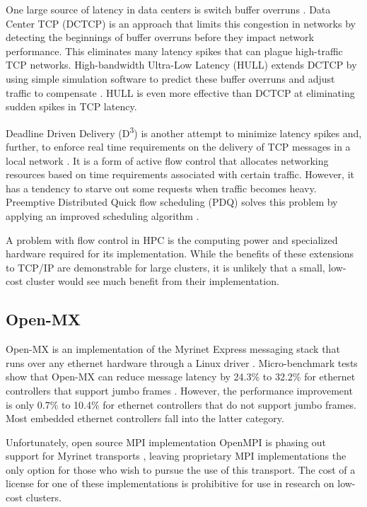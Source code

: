 \documentclass[11pt]{book}
\begin{document}
One large source of latency in data centers is switch buffer overruns
\cite{liu-13}. Data Center TCP (DCTCP) is an approach that limits this
congestion in networks by detecting the beginnings of buffer overruns before they impact
network performance. This eliminates many latency spikes that can plague
high-traffic TCP networks. High-bandwidth Ultra-Low Latency (HULL) extends DCTCP
by using simple simulation software to predict these buffer overruns and adjust
traffic to compensate \cite{liu-13}. HULL is even more effective than DCTCP at
eliminating sudden spikes in TCP latency.

Deadline Driven Delivery (D\textsuperscript{3}) is another attempt to minimize latency spikes
and, further, to enforce real time requirements on the delivery of TCP messages
in a local network \cite{liu-13}. It is a form of active flow control that allocates
networking resources based on time requirements associated with certain
traffic. However, it has a tendency to starve out some requests when traffic
becomes heavy. Preemptive Distributed Quick flow scheduling (PDQ) solves this
problem by applying an improved scheduling algorithm \cite{liu-13}.

A problem with flow control in HPC is the computing power and specialized
hardware required for its implementation. While the benefits of these extensions
to TCP/IP are demonstrable for large clusters, it is unlikely that a small,
low-cost cluster would see much benefit from their implementation.

\subsection{\textbf{Open-MX}}

Open-MX is an implementation of the Myrinet Express messaging stack that runs
over any ethernet hardware through a Linux driver
\cite{goglin-08}. Micro-benchmark tests show that Open-MX can reduce message
latency by 24.3\% to 32.2\% for ethernet controllers that support jumbo frames
\cite{goglin-11}. However, the performance improvement is only 0.7\% to 10.4\%
for ethernet controllers that do not support jumbo frames. Most embedded
ethernet controllers fall into the latter category.

Unfortunately, open source MPI implementation OpenMPI is phasing out support for
Myrinet transports \cite{openmpi-myrinet}, leaving proprietary MPI implementations
the only option for those who wish to pursue the use of this transport. The cost
of a license for one of these implementations is prohibitive for use in research
on low-cost clusters.
\end{document}
